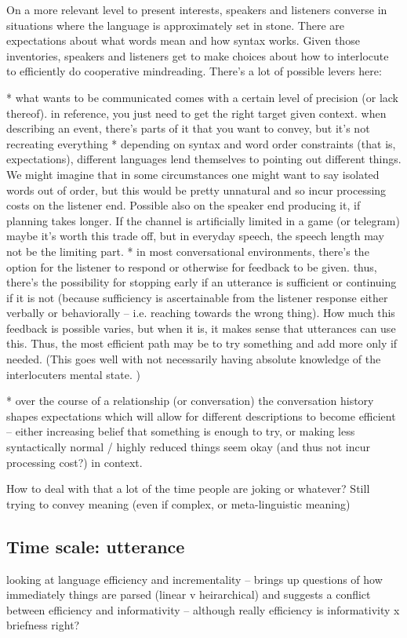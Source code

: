 \documentclass[]{article}
\begin{document}
On a more relevant level to present interests, speakers and listeners converse in situations where the language is approximately set in stone. There are expectations about what words mean and how syntax works. Given those inventories, speakers and listeners get to make choices about how to interlocute to efficiently do cooperative mindreading. There's a lot of possible levers here: 

* what wants to be communicated comes with a certain level of precision (or lack thereof). in reference, you just need to get the right target given context. when describing an event, there's parts of it that you want to convey, but it's not recreating everything
* depending on syntax and word order constraints (that is, expectations), different languages lend themselves to pointing out different things. We might imagine that in some circumstances one might want to say isolated words out of order, but this would be pretty unnatural and so incur processing costs on the listener end. Possible also on the speaker end producing it, if planning takes longer. If the channel is artificially limited in a game (or telegram) maybe it's worth this trade off, but in everyday speech, the speech length may not be the limiting part. 
* in most conversational environments, there's the option for the listener to respond or otherwise for feedback to be given. thus, there's the possibility for stopping early if an utterance is sufficient or continuing if it is not (because sufficiency is ascertainable from the listener response either verbally or behaviorally -- i.e. reaching towards the wrong thing). How much this feedback is possible varies, but when it is, it makes sense that utterances can use this. Thus, the most efficient path may be to try something and add more only if needed. (This goes well with not necessarily having absolute knowledge of the interlocuters mental state. )

* over the course of a relationship (or conversation) the conversation history shapes expectations which will allow for different descriptions to become efficient -- either increasing belief that something is enough to try, or making less syntactically normal / highly reduced things seem okay (and thus not incur processing cost?) in context. 

How to deal with that a lot of the time people are joking or whatever? Still trying to convey meaning (even if complex, or meta-linguistic meaning)

\subsection{Time scale: utterance} 
\cite{rubio-fernandez2021} looking at language efficiency and incrementality -- brings up questions of how immediately things are parsed (linear v heirarchical) and suggests a conflict between efficiency and informativity -- although really efficiency is informativity x briefness right? 
\end{document}
